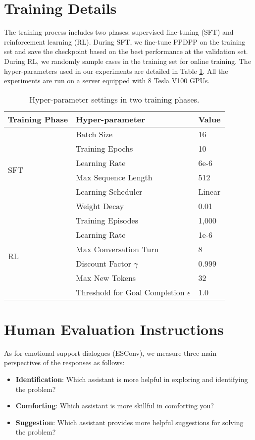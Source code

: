 \documentclass{article} %
\begin{document}
\section{Training Details}\label{app:implement}
The training process includes two phases: supervised fine-tuning (SFT) and reinforcement learning (RL). 
During SFT, we fine-tune PPDPP on the training set and save the checkpoint based on the best performance at the validation set. 
During RL, we randomly sample cases in the training set for online training. 
The hyper-parameters used in our experiments are detailed in Table \ref{tab:hyperparam}.
All the experiments are run on a server equipped with 8 Tesla V100 GPUs. 


\begin{table}[h]
    \centering
    \begin{tabular}{lll}
    \toprule
    Training Phase   &  Hyper-parameter & Value\\
    \midrule
     \multirow{6}{*}{SFT}  & Batch Size & 16\\
     & Training Epochs & 10 \\
     & Learning Rate & 6e-6\\
     & Max Sequence Length & 512 \\
     & Learning Scheduler & Linear\\
    & Weight Decay & 0.01\\
    \midrule
    \multirow{6}{*}{RL} & Training Episodes & 1,000\\
    & Learning Rate & 1e-6\\
    & Max Conversation Turn & 8 \\
    & Discount Factor $\gamma$ & 0.999 \\
    & Max New Tokens & 32 \\
    & Threshold for Goal Completion $\epsilon$ & 1.0 \\
    \bottomrule
    \end{tabular}
    \caption{Hyper-parameter settings in two training phases.}
    \label{tab:hyperparam}
\end{table}

\section{Human Evaluation Instructions}\label{app:human}
As for emotional support dialogues (ESConv), we measure three main perspectives of the responses as follows:
\begin{itemize}[leftmargin=*]
    \item \textbf{Identification}:  Which assistant is more helpful in exploring and identifying the problem?
    \item \textbf{Comforting}:  Which assistant is more skillful in comforting you?
    \item \textbf{Suggestion}: Which assistant provides more helpful suggestions for solving the problem?
\end{itemize}
\end{document}
